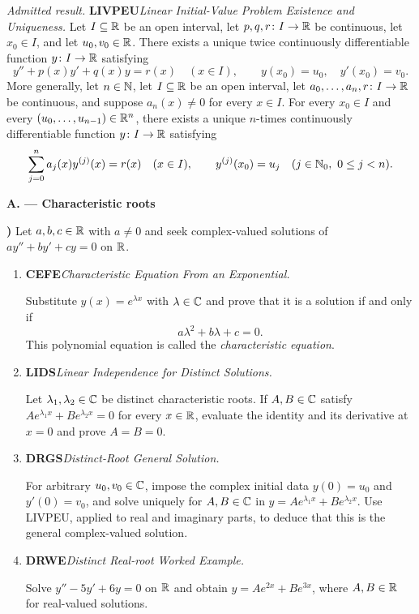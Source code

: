 \documentclass[10pt,a4paper]{article}
\newcounter{examquestion}
\newcommand{\examquestion}[1]{%
  \Needspace{5\baselineskip}%
  \refstepcounter{examquestion}%
  \par\addvspace{0.8\baselineskip}%
  \noindent\textbf{\theexamquestion)}\enspace #1\par
}
\newenvironment{subquestions}
  {\begin{enumerate}[label=\alph*),leftmargin=2.1em]}
  {\end{enumerate}}
\newcommand{\nameditem}[2]{%
  \textbf{\textsf{#1}}\enspace\emph{#2.}\enspace
}
\newcommand{\admitted}[3]{%
  \par\smallskip\noindent\emph{Admitted result.}\enspace
  \nameditem{#1}{#2}#3\par
}
\newcommand{\subpart}[1]{%
  \begin{center}
    \textbf{#1}
  \end{center}
}
\begin{document}
\admitted{LIVPEU}{Linear Initial-Value Problem Existence and Uniqueness}{Let
$I\subseteq\mathbb{R}$ be an open interval, let $p,q,r\colon I\to\mathbb{R}$ be
continuous, let $x_0\in I$, and let $u_0,v_0\in\mathbb{R}$.  There exists a unique
twice continuously differentiable function $y\colon I\to\mathbb{R}$ satisfying
\[
  y''+p(x)y'+q(x)y=r(x)\quad(x\in I),
  \qquad y(x_0)=u_0,\quad y'(x_0)=v_0.
\]
More generally, let $n\in\mathbb{N}$, let $I\subseteq\mathbb{R}$ be an open interval, let
$a_0,\ldots,a_n,r\colon I\to\mathbb{R}$ be continuous, and suppose
$a_n(x)\ne0$ for every $x\in I$.  For every $x_0\in I$ and every
$(u_0,\ldots,u_{n-1})\in\mathbb{R}^n$, there exists a unique $n$-times continuously
differentiable function $y\colon I\to\mathbb{R}$ satisfying
\[
  \sum_{j=0}^{n}a_j(x)y^{(j)}(x)=r(x)\quad(x\in I),
  \qquad
  y^{(j)}(x_0)=u_j\quad(j\in\mathbb{N}_0,\ 0\leq j<n).
\]}

\subpart{A. --- Characteristic roots}

\examquestion{\label{q:second-characteristic}
Let $a,b,c\in\mathbb{R}$ with $a\ne0$ and seek complex-valued solutions of
$ay''+by'+cy=0$ on $\mathbb{R}$.
\begin{subquestions}
  \item \nameditem{CEFE}{Characteristic Equation From an Exponential}
  Substitute $y(x)=e^{\lambda x}$ with $\lambda\in\mathbb{C}$ and prove that it
  is a solution if and only if
  \[
    a\lambda^2+b\lambda+c=0.
  \]
  This polynomial equation is called the \emph{characteristic equation}.

  \item \nameditem{LIDS}{Linear Independence for Distinct Solutions}
  Let $\lambda_1,\lambda_2\in\mathbb{C}$ be distinct characteristic roots.  If
  $A,B\in\mathbb{C}$ satisfy
  $Ae^{\lambda_1x}+Be^{\lambda_2x}=0$ for every $x\in\mathbb{R}$, evaluate
  the identity and its derivative at $x=0$ and prove $A=B=0$.

  \item \nameditem{DRGS}{Distinct-Root General Solution}
  For arbitrary $u_0,v_0\in\mathbb{C}$, impose the complex initial data
  $y(0)=u_0$ and $y'(0)=v_0$, and solve uniquely for $A,B\in\mathbb{C}$ in
  $y=Ae^{\lambda_1x}+Be^{\lambda_2x}$.  Use LIVPEU, applied to real and
  imaginary parts, to deduce that this is the general complex-valued
  solution.

  \item \nameditem{DRWE}{Distinct Real-root Worked Example}
  Solve $y''-5y'+6y=0$ on $\mathbb{R}$ and obtain
  $y=Ae^{2x}+Be^{3x}$, where $A,B\in\mathbb{R}$ for real-valued solutions.
\end{subquestions}}
\end{document}
